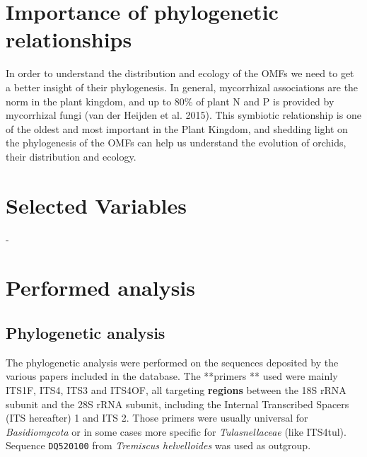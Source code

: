 \chapter{Importance of phylogenetic relationships}
\label{importanceofphylogeneticrelationships}

In order to understand the distribution and ecology of the OMFs we need to get a better insight of their phylogenesis. In general, mycorrhizal associations are the norm in the plant kingdom, and up to 80\% of plant N and P is provided by mycorrhizal fungi (van der Heijden et al. 2015). This symbiotic relationship is one of the oldest and most important in the Plant Kingdom, and shedding light on the phylogenesis of the OMFs can help us understand the evolution of orchids, their distribution and ecology.

\chapter{Selected Variables}
\label{selectedvariables}

-

\chapter{Performed analysis}
\label{performedanalysis}

\section{Phylogenetic analysis}
\label{phylogeneticanalysis}

The phylogenetic analysis were performed on the sequences deposited by the various papers included in the database.
The **primers ** used were mainly ITS1F, ITS4, ITS3 and ITS4OF, all targeting \textbf{regions} between the 18S rRNA subunit and the 28S rRNA subunit, including the Internal Transcribed Spacers (ITS hereafter) 1 and ITS 2. Those primers were usually universal for \emph{Basidiomycota} or in some cases more specific for \emph{Tulasnellaceae} (like ITS4tul).
Sequence \texttt{DQ520100} from \emph{Tremiscus helvelloides} was used as outgroup.

